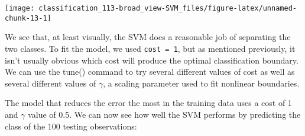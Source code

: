 \documentclass[]{book}
\newenvironment{Shaded}{\begin{snugshade}}{\end{snugshade}}
\newcommand{\CommentTok}[1]{\textcolor[rgb]{0.56,0.35,0.01}{\textit{#1}}}
\newcommand{\DataTypeTok}[1]{\textcolor[rgb]{0.13,0.29,0.53}{#1}}
\newcommand{\DecValTok}[1]{\textcolor[rgb]{0.00,0.00,0.81}{#1}}
\newcommand{\FloatTok}[1]{\textcolor[rgb]{0.00,0.00,0.81}{#1}}
\newcommand{\KeywordTok}[1]{\textcolor[rgb]{0.13,0.29,0.53}{\textbf{#1}}}
\newcommand{\NormalTok}[1]{#1}
\newcommand{\OperatorTok}[1]{\textcolor[rgb]{0.81,0.36,0.00}{\textbf{#1}}}
\newcommand{\StringTok}[1]{\textcolor[rgb]{0.31,0.60,0.02}{#1}}
\begin{document}
\begin{center}\texttt{[image: classification\_113-broad\_view-SVM\_files/figure-latex/unnamed-chunk-13-1]} \end{center}

We see that, at least visually, the SVM does a reasonable job of separating the two classes. To fit the model, we used \texttt{cost\ =\ 1}, but as mentioned previously, it isn't usually obvious which cost will produce the optimal classification boundary. We can use the tune() command to try several different values of cost as well as several different values of \(\gamma\), a scaling parameter used to fit nonlinear boundaries.

\begin{Shaded}
\end{Shaded}

The model that reduces the error the most in the training data uses a cost of 1 and \(\gamma\)
value of 0.5. We can now see how well the SVM performs by predicting the class of the 100 testing observations:
\end{document}
